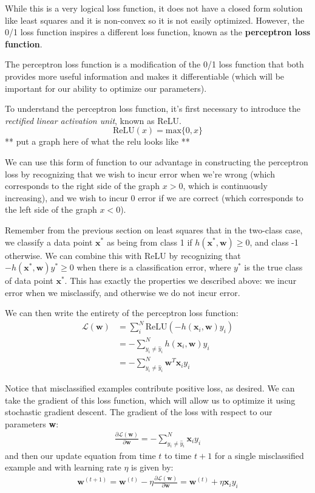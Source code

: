 While this is a very logical loss function, it does not have a closed form solution like least squares and it is non-convex so it is not easily optimized. However, the 0/1 loss function inspires a different loss function, known as the \textbf{perceptron loss function}.

The perceptron loss function is a modification of the 0/1 loss function that both provides more useful information and makes it differentiable (which will be important for our ability to optimize our parameters).

To understand the perceptron loss function, it's first necessary to introduce the \textit{rectified linear activation unit}, known as ReLU.
\begin{equation}
	\text{ReLU}(x) = \text{max}\{0, x\}
\end{equation}
** put a graph here of what the relu looks like **

We can use this form of function to our advantage in constructing the perceptron loss by recognizing that we wish to incur error when we're wrong (which corresponds to the right side of the graph $x > 0$, which is continuously increasing), and we wish to incur 0 error if we are correct (which corresponds to the left side of the graph $x < 0$).

Remember from the previous section on least squares that in the two-class case, we classify a data point $\textbf{x}^{*}$ as being from class 1 if $h(\textbf{x}^{*}, \textbf{w}) \geq 0$, and class -1 otherwise. We can combine this with ReLU by recognizing that $-h(\textbf{x}^{*}, \textbf{w})y^{*} \geq 0$ when there is a classification error, where $y^{*}$ is the true class of data point $\textbf{x}^{*}$. This has exactly the properties we described above: we incur error when we misclassify, and otherwise we do not incur error.

We can then write the entirety of the perceptron loss function:
\begin{align}
	\mathcal{L}(\textbf{w}) &= \sum_{i}^{N} \text{ReLU}(-h(\textbf{x}_{i}, \textbf{w})y_{i}) \\
	&= -\sum_{y_{i} \neq \hat{y}_{i}}^{N} h(\textbf{x}_{i}, \textbf{w})y_{i} \\
	&= -\sum_{y_{i} \neq \hat{y}_{i}}^{N} \textbf{w}^{T}\textbf{x}_{i} y_{i}
\end{align}

Notice that misclassified examples contribute positive loss, as desired. We can take the gradient of this loss function, which will allow us to optimize it using stochastic gradient descent. The gradient of the loss with respect to our parameters \textbf{w}:
\begin{align*}
	\frac{\partial \mathcal{L}(\textbf{w})}{\partial \textbf{w}} = -\sum_{y_{i} \neq \hat{y}_{i}}^{N} \textbf{x}_{i} y_{i}
\end{align*}
and then our update equation from time $t$ to time $t+1$ for a single misclassified example and with learning rate $\eta$ is given by:
\begin{align*}
	\textbf{w}^{(t+1)} = \textbf{w}^{(t)} - \eta\frac{\partial \mathcal{L}(\textbf{w})}{\partial \textbf{w}} = \textbf{w}^{(t)} + \eta \textbf{x}_{i} y_{i}
\end{align*}

